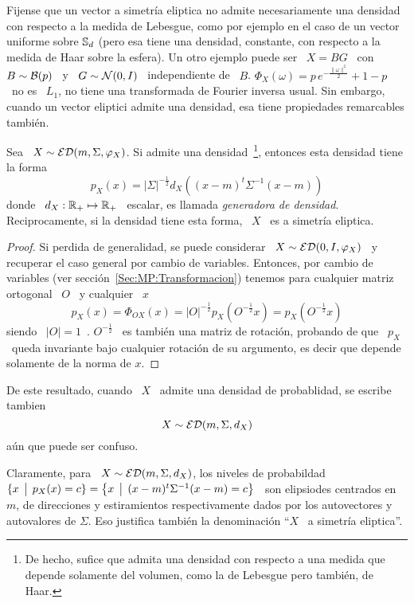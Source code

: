 Fijense  que  un vector  a  simetr\'ia  eliptica  no admite  necesariamente  una
densidad con respecto a la medida de  Lebesgue, como por ejemplo en el caso de un
vector uniforme  sobre $\mathbb{S}_d$  (pero esa tiene  una densidad,  constante, con
respecto a la medida de Haar sobre la esfera). Un otro ejemplo puede ser \ $X = B
G$  \ con  \  $B \sim  \mathcal{B}(p)$  \  y \  $G  \sim \mathcal{N}(0,I)$  \  independiente de  \
$B$. $\Phi_X(\omega)  = p \, e^{-\frac{\|  \omega \|^2}{2}} + 1  - p$ \  no es \
$L_1$,  \ie no tiene  una transformada  de Fourier  inversa usual.  Sin embargo,
cuando un vector eliptici admite una densidad, esa tiene propiedades remarcables
tambi\'en.
%
\begin{teorema}
%
  Sea \ $X \sim \mathcal{ED}(m,\Sigma,\varphi_X)$. Si  admite una  densidad~\footnote{De hecho, sufice  que admita
    una densidad  con respecto  a una medida  que depende solamente  del volumen,
    como la de Lebesgue pero  tambi\'en, de Haar.}, entonces esta densidad tiene
  la forma
  \[
  p_X(x)  = |\Sigma|^{-\frac12} d_X\left( (x-m)^t \Sigma^{-1} (x-m) \right)
  \]
  donde \ $d_X:  \mathbb{R}_+ \mapsto \mathbb{R}_+$ \ escalar,  es llamada {\em generadora
    de densidad}. Reciprocamente, si la densidad  tiene esta forma, \ $X$ \ es a
  simetr\'ia eliptica.
\end{teorema}
%
\begin{proof}
  Si perdida de generalidad, se puede considerar \ $X \sim \mathcal{ED}(0,I,\varphi_X)$ \
  y recuperar el  caso general por cambio de variables.  Entonces, por cambio de
  variables  (ver secci\'on~\ref{Sec:MP:Transformacion}) tenemos  para cualquier
  matriz ortogonal \ $O$ \ y cualquier \ $x$
  \[
  p_X(x) = \Phi_{O X}(x) = |O|^{-\frac12} p_X\left( O^{-\frac12} x \right) = p_X\left( O^{-\frac12} x \right)
  \]
  siendo \ $|O|  = 1$~\cite{Bha97, HorJoh13}. $O^{-\frac12}$ \  es tambi\'en una
  matriz  de  rotaci\'on,  probando de  que  \  $p_X$  \ queda  invariante  bajo
  cualquier rotaci\'on  de su  argumento, es decir  que depende solamente  de la
  norma de $x$.
\end{proof}

De este resultado, cuando \ $X$ \ admite una densidad de probablidad, se escribe tambien
%
\[
X \sim \mathcal{ED}(m,\Sigma,d_X)
\]
%
a\'un que puede ser confuso.

Claramente, para \ $X \sim  \mathcal{ED}(m,\Sigma,d_X)$, los niveles de probabildad \ $\{
x \:\: \big| \:\: p_X(x)  = c \} = \left\{  x \:\: \big| \:\: (x-m)^t \Sigma^{-1} (x-m) =  c \right\}$ \
son   elipsiodes  centrados   en   \  $m$,   de   direcciones  y   estiramientos
respectivamente  dados  por los  autovectores  y  autovalores  de $\Sigma$.  Eso
justifica tambi\'en la denominaci\'on ``$X$ \ a simetr\'ia eliptica''.

